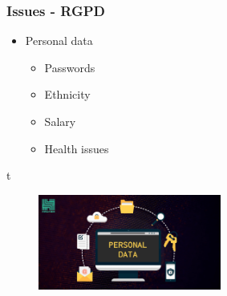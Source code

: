 \begin{frame}\frametitle{Issues - RGPD}

   \begin{minipage}{0.38\linewidth}
      \begin{itemize}
         \item Personal data
         \begin{itemize}
            \item Passwords
            \item Ethnicity
            \item Salary
            \item Health issues
         \end{itemize}
      \end{itemize}t
   \end{minipage}
   \begin{minipage}{0.6\linewidth}
      \begin{figure}[H]
         \includegraphics[width=6cm]{../images/illustrations/personal_data.png}
      \end{figure}
   \end{minipage}
\end{frame}



